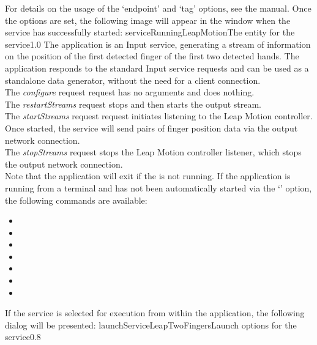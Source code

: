 For details on the usage of the `endpoint' and `tag' options, see the \emph{\MMMU} manual.
Once the options are set, the following image will appear in the \emph{\MMMU} window when
the service has successfully started:
%
{serviceRunningLeapMotion}{The \emph{\MMMU} entity for the \emph{\LMI} service}{1.0}
\secondaryEnd
\primaryEnd
{}
The  application is an Input service,
generating a stream of information on the position of the first detected finger of the
first two detected hands.
The application responds to the standard Input service requests and can be used as a
standalone data generator, without the need for a client connection.\\

The \emph{configure} request request has no arguments and does nothing.\\

The \emph{restartStreams} request stops and then starts the output stream.\\

The \emph{startStreams} request request initiates listening to the Leap Motion controller.
Once started, the service will send pairs of finger position data via the output \yarp{}
network connection.\\

The \emph{stopStreams} request stops the Leap Motion controller listener, which stops the
output \yarp{} network connection.\\ 

Note that the application will exit if the \emph{\RS} is not running.
\insertAppParameters
\insertTagDescription{\LTFI}
\insertInputServiceComment
\condPage{}
If the application is running from a terminal and has not been automatically started via
the `' option, the following commands are available:
\begin{itemize}
\item{}
\item\exSp{}
\item\exSp{}
\item\exSp{}
\item\exSp{}
\item\exSp{}
\item\exSp{}
\end{itemize}
\secondaryEnd
\condPage
{}
If the service is selected for execution from within the \emph{\MMMU} application, the
following dialog will be presented:
%
{launchServiceLeapTwoFingers}{Launch options for the \emph{\LTFI} service}{0.8}


